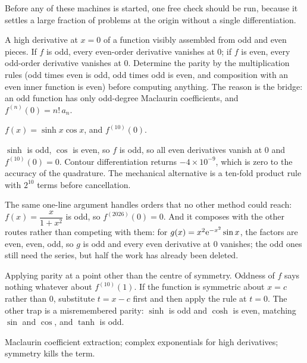 Before any of these machines is started, one free check should be run, because it settles a large fraction of problems at the origin without a single differentiation.

\cue A high derivative at $x=0$ of a function visibly assembled from odd and even pieces.
\method If $f$ is odd, every even-order derivative vanishes at $0$; if $f$ is even, every odd-order derivative vanishes at $0$. Determine the parity by the multiplication rules (odd times even is odd, odd times odd is even, and composition with an even inner function is even) before computing anything. The reason is the bridge: an odd function has only odd-degree Maclaurin coefficients, and $f^{(n)}(0)=n!\,a_{n}$.

\begin{worked}
$f(x)=\sinh x\cos x$, and $f^{(10)}(0)$.

$\sinh$ is odd, $\cos$ is even, so $f$ is odd, so all even derivatives vanish at $0$ and $f^{(10)}(0)=0$. Contour differentiation returns $-4\times10^{-9}$, which is zero to the accuracy of the quadrature. The mechanical alternative is a ten-fold product rule with $2^{10}$ terms before cancellation.

The same one-line argument handles orders that no other method could reach: $f(x)=\dfrac{x}{1+x^{2}}$ is odd, so $f^{(2026)}(0)=0$. And it composes with the other routes rather than competing with them: for $g(x)=x^{2}\mathrm{e}^{-x^{2}}\sin x$, the factors are even, even, odd, so $g$ is odd and every even derivative at $0$ vanishes; the odd ones still need the series, but half the work has already been deleted.
\end{worked}

\begin{trap}
Applying parity at a point other than the centre of symmetry. Oddness of $f$ says nothing whatever about $f^{(10)}(1)$. If the function is symmetric about $x=c$ rather than $0$, substitute $t=x-c$ first and then apply the rule at $t=0$. The other trap is a misremembered parity: $\sinh$ is odd and $\cosh$ is even, matching $\sin$ and $\cos$, and $\tanh$ is odd.
\end{trap}

\begin{seealsob}Maclaurin coefficient extraction; complex exponentials for high derivatives; symmetry kills the term.\end{seealsob}


